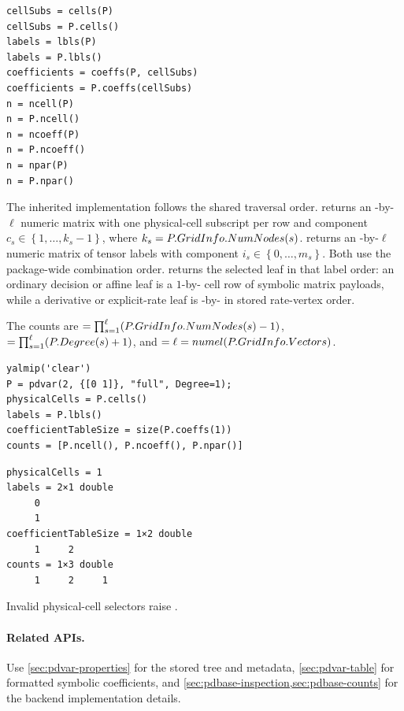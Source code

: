 \syntaxhead
\begin{lstlisting}[style=dpsyntax]
cellSubs = cells(P)
cellSubs = P.cells()
labels = lbls(P)
labels = P.lbls()
coefficients = coeffs(P, cellSubs)
coefficients = P.coeffs(cellSubs)
n = ncell(P)
n = P.ncell()
n = ncoeff(P)
n = P.ncoeff()
n = npar(P)
n = P.npar()
\end{lstlisting}

\descriptionhead
The inherited implementation follows the shared  traversal order.  returns an -by-$\ell$ numeric matrix with one physical-cell subscript per row and component $c_s\in\left\{1,\ldots,k_s-1\right\}$, where $k_s=P.GridInfo.NumNodes(s)$.  returns an -by-$\ell$ numeric matrix of tensor labels with component $i_s\in\left\{0,\ldots,m_s\right\}$. Both use the package-wide combination order.  returns the selected leaf in that label order: an ordinary decision or affine leaf is a $1$-by- cell row of symbolic matrix payloads, while a derivative or explicit-rate leaf is -by- in stored rate-vertex order.

The counts are $=\prod_{s=1}^{\ell}(P.GridInfo.NumNodes(s)-1)$, $=\prod_{s=1}^{\ell}(P.Degree(s)+1)$, and $=\ell=numel(P.GridInfo.Vectors)$.

\examplehead
\begin{lstlisting}[style=dpmatlab]
yalmip('clear')
P = pdvar(2, {[0 1]}, "full", Degree=1);
physicalCells = P.cells()
labels = P.lbls()
coefficientTableSize = size(P.coeffs(1))
counts = [P.ncell(), P.ncoeff(), P.npar()]
\end{lstlisting}
\begin{lstlisting}[style=dpoutput]
physicalCells = 1
labels = 2×1 double
     0
     1
coefficientTableSize = 1×2 double
     1     2
counts = 1×3 double
     1     2     1
\end{lstlisting}

\remarkshead
Invalid physical-cell selectors raise .

\paragraph{Related APIs.}
Use \cref{sec:pdvar-properties} for the stored tree and metadata, \cref{sec:pdvar-table} for formatted symbolic coefficients, and \cref{sec:pdbase-inspection,sec:pdbase-counts} for the backend implementation details.

